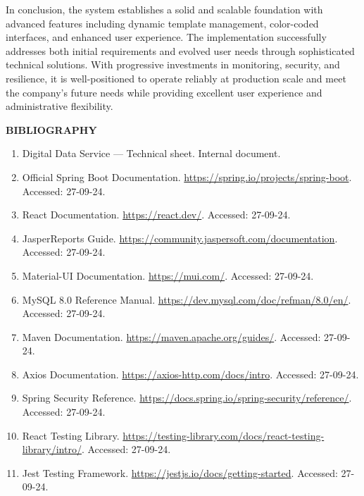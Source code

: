 \documentclass[a4paper,12pt]{report}
\begin{document}
\begin{doublespace}
In conclusion, the system establishes a solid and scalable foundation with advanced features including dynamic template management, color-coded interfaces, and enhanced user experience. The implementation successfully addresses both initial requirements and evolved user needs through sophisticated technical solutions. With progressive investments in monitoring, security, and resilience, it is well-positioned to operate reliably at production scale and meet the company's future needs while providing excellent user experience and administrative flexibility.
\end{doublespace}

\newpage
\renewcommand{\headrulewidth}{1pt}
\fancyhead[L]{\hspace*{4cm}}
\begin{center}
\textbf{\huge{BIBLIOGRAPHY}}

\end{center}
\begin{doublespace}
\large{
\begin{enumerate}
    \item Digital Data Service — Technical sheet. Internal document.
    \item Official Spring Boot Documentation. \url{https://spring.io/projects/spring-boot}. Accessed: 27-09-24.
    \item React Documentation. \url{https://react.dev/}. Accessed: 27-09-24.
    \item JasperReports Guide. \url{https://community.jaspersoft.com/documentation}. Accessed: 27-09-24.
    \item Material-UI Documentation. \url{https://mui.com/}. Accessed: 27-09-24.
    \item MySQL 8.0 Reference Manual. \url{https://dev.mysql.com/doc/refman/8.0/en/}. Accessed: 27-09-24.
    \item Maven Documentation. \url{https://maven.apache.org/guides/}. Accessed: 27-09-24.
    \item Axios Documentation. \url{https://axios-http.com/docs/intro}. Accessed: 27-09-24.
    \item Spring Security Reference. \url{https://docs.spring.io/spring-security/reference/}. Accessed: 27-09-24.
    \item React Testing Library. \url{https://testing-library.com/docs/react-testing-library/intro/}. Accessed: 27-09-24.
    \item Jest Testing Framework. \url{https://jestjs.io/docs/getting-started}. Accessed: 27-09-24.
\end{enumerate}
}
\end{doublespace}
\end{document}
